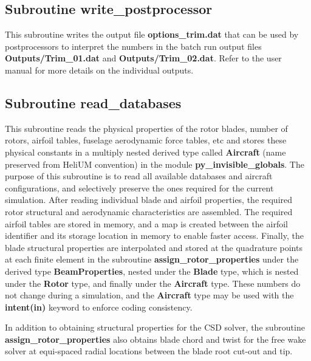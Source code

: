 \subsection{Subroutine write\_postprocessor}
This subroutine writes the output file \textbf{options\_trim.dat} that can be used by postprocessors to interpret the numbers in the batch run output files \textbf{Outputs/Trim\_01.dat} and \textbf{Outputs/Trim\_02.dat}. Refer to the user manual for more details on the individual outputs.

\subsection{Subroutine read\_databases}
This subroutine reads the physical properties of the rotor blades, number of rotors, airfoil tables, fuselage aerodynamic force tables, etc and stores these physical constants in a multiply nested derived type called \textbf{Aircraft} (name preserved from HeliUM convention) in the module \textbf{py\_invisible\_globals}. The purpose of this subroutine is to read all available databases and aircraft configurations, and selectively preserve the ones required for the current simulation. After reading individual blade and airfoil properties, the required rotor structural and aerodynamic characteristics are assembled. The required airfoil tables are stored in memory, and a map is created between the airfoil identifier and its storage location in memory to enable faster access. Finally, the blade structural properties are interpolated and stored at the quadrature points at each finite element in the subroutine \textbf{assign\_rotor\_properties} under the derived type \textbf{BeamProperties}, nested under the \textbf{Blade} type, which is nested under the \textbf{Rotor} type, and finally under the \textbf{Aircraft} type. These numbers do not change during a simulation, and the \textbf{Aircraft} type may be used with the \textbf{intent(in)} keyword to enforce coding consistency. 

In addition to obtaining structural properties for the CSD solver, the subroutine \textbf{assign\_rotor\_properties} also obtains blade chord and twist for the free wake solver at equi-spaced radial locations between the blade root cut-out and tip.

